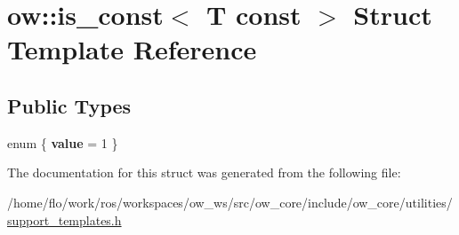 \hypertarget{structow_1_1is__const_3_01T_01const_01_01_4}{}\section{ow\+:\+:is\+\_\+const$<$ T const $>$ Struct Template Reference}
\label{structow_1_1is__const_3_01T_01const_01_01_4}
\subsection*{Public Types}
\begin{DoxyCompactItemize}
\item 
enum \{ {\bfseries value} = 1
 \}\hypertarget{structow_1_1is__const_3_01T_01const_01_01_4_a586b17f723e8e1faaf55a087d8a33fad}{}\label{structow_1_1is__const_3_01T_01const_01_01_4_a586b17f723e8e1faaf55a087d8a33fad}

\end{DoxyCompactItemize}


The documentation for this struct was generated from the following file\+:\begin{DoxyCompactItemize}
\item 
/home/flo/work/ros/workspaces/ow\+\_\+ws/src/ow\+\_\+core/include/ow\+\_\+core/utilities/\hyperlink{support__templates_8h}{support\+\_\+templates.\+h}\end{DoxyCompactItemize}
